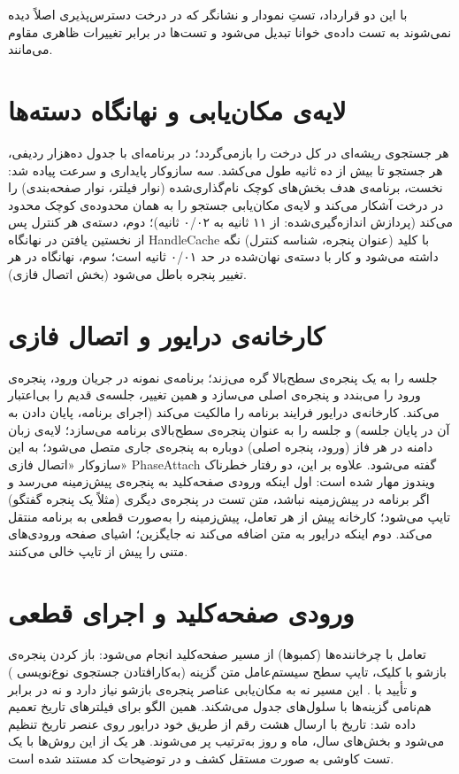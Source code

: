 با این دو قرارداد، تستِ نمودار و نشانگر \pdash{} که در درخت دسترس‌پذیری اصلاً دیده نمی‌شوند \pdash{} به تست داده‌ی خوانا تبدیل می‌شود و تست‌ها در برابر تغییرات ظاهری مقاوم می‌مانند.

\section{لایه‌ی مکان‌یابی و نهانگاه دسته‌ها}
هر جستجوی ریشه‌ای در
کل درخت را بازمی‌گردد؛ در برنامه‌ای با جدول ده‌هزار ردیفی، هر جستجو تا بیش از ده ثانیه طول می‌کشد. سه سازوکار پایداری و سرعت پیاده شد: نخست، برنامه‌ی هدف بخش‌های کوچک نام‌گذاری‌شده (نوار فیلتر، نوار صفحه‌بندی) را در درخت آشکار می‌کند و لایه‌ی مکان‌یابی جستجو را به همان محدوده‌ی کوچک محدود می‌کند (پردازش اندازه‌گیری‌شده: از ۱۱ ثانیه به ۰/۰۲ ثانیه)؛ دوم، دسته‌ی  هر کنترل پس از نخستین یافتن در نهانگاه
\gls{HandleCache}
با کلید (عنوان پنجره، شناسه کنترل) نگه داشته می‌شود و کار با دسته‌ی نهان‌شده در حد ۰/۰۱ ثانیه است؛ سوم، نهانگاه در هر تغییر پنجره باطل می‌شود (بخش اتصال فازی).

\section{کارخانه‌ی درایور و اتصال فازی}
جلسه را به یک پنجره‌ی سطح‌بالا گره می‌زند؛ برنامه‌ی نمونه در جریان ورود، پنجره‌ی ورود را می‌بندد و پنجره‌ی اصلی می‌سازد و همین تغییر، جلسه‌ی قدیم را بی‌اعتبار می‌کند. کارخانه‌ی درایور فرایند برنامه را مالکیت می‌کند (اجرای برنامه، پایان دادن به آن در پایان جلسه) و جلسه را به عنوان پنجره‌ی سطح‌بالای برنامه می‌سازد؛ لایه‌ی زبان دامنه در هر فاز (ورود، پنجره اصلی) دوباره به پنجره‌ی جاری متصل می‌شود؛ به این سازوکار «اتصال فازی»
\gls{PhaseAttach}
گفته می‌شود. علاوه بر این، دو رفتار خطرناک ویندوز مهار شده است: اول اینکه ورودی صفحه‌کلید به پنجره‌ی پیش‌زمینه می‌رسد و اگر برنامه در پیش‌زمینه نباشد، متن تست در پنجره‌ی دیگری (مثلاً یک پنجره گفتگو) تایپ می‌شود؛ کارخانه پیش از هر تعامل، پیش‌زمینه را به‌صورت قطعی به برنامه منتقل می‌کند. دوم اینکه
درایور به متن اضافه می‌کند نه جایگزین؛ اشیای صفحه ورودی‌های متنی را پیش از تایپ خالی می‌کنند.

\section{ورودی صفحه‌کلید و اجرای قطعی}
تعامل با چرخاننده‌ها (کمبوها) از مسیر صفحه‌کلید انجام می‌شود: باز کردن پنجره‌ی بازشو با کلیک، تایپ سطح سیستم‌عامل متن گزینه (به‌کارافتادن جستجوی نوع‌نویسی
)
و تأیید با
.
این مسیر نه به مکان‌یابی عناصر پنجره‌ی بازشو نیاز دارد و نه در برابر هم‌نامی گزینه‌ها با سلول‌های جدول می‌شکند. همین الگو برای فیلترهای تاریخ تعمیم داده شد: تاریخ با ارسال هشت رقم از طریق خود درایور روی عنصر تاریخ تنظیم می‌شود و بخش‌های سال، ماه و روز به‌ترتیب پر می‌شوند. هر یک از این روش‌ها با یک تست کاوشی
به صورت مستقل کشف و در توضیحات کد مستند شده است.

